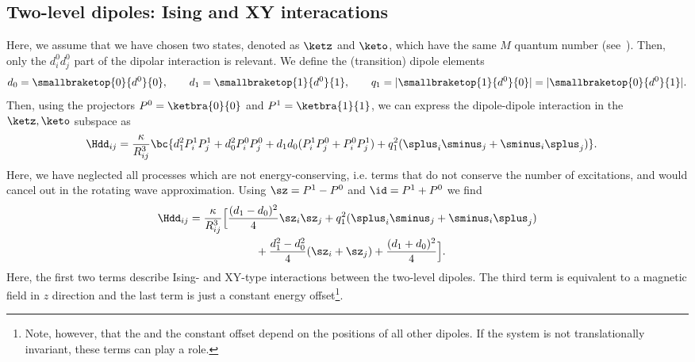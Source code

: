 \subsection{Two-level dipoles: Ising and XY interacations}
Here, we assume that we have chosen two states, denoted as $\ketz$ and $\keto$, which have the
same $M$ quantum number (see~).
Then, only the $d^0_id^0_j$ part of the dipolar interaction is relevant.
We define the (transition) dipole elements
\begin{align}
    d_0 = \smallbraketop{0}{d^0}{0},\qquad
    d_1 = \smallbraketop{1}{d^0}{1},\qquad
    q_1 = |\smallbraketop{1}{d^0}{0}| = |\smallbraketop{0}{d^0}{1}|.
\end{align}
Then, using the projectors $P^0 = \ketbra{0}{0}$ and $P^1 = \ketbra{1}{1}$, we can express the
dipole-dipole interaction  in the $\ketz, \keto$ subspace as
\begin{align}
    \Hdd_{ij} &= \frac{\kappa}{R_{ij}^3} \bc {d_1^2 P^1_i P^1_j + d_0^2 P^0_i P^0_j + d_1d_0 (P^1_i P^0_j + P^0_i P^1_j) + q_1^2 (\splus_i \sminus_j + \sminus_i \splus_j) }.
\end{align}
Here, we have neglected all processes which are not energy-conserving,
i.e. terms that do not conserve the number of excitations, and would
cancel out in the rotating wave approximation.
Using $\sz = P^1 - P^0$ and $\id = P^1 + P^0$ we find
\begin{align}
    \Hdd_{ij} &= \frac{\kappa}{R_{ij}^3} \Big[ \frac{(d_1-d_0)^2}{4} \sz_i \sz_j  + q_1^2 (\splus_i \sminus_j + \sminus_i \splus_j)\\
              &\qquad\qquad\qquad + \frac{d_1^2 - d_0^2}{4} (\sz_i + \sz_j)  + \frac{(d_1+d_0)^2}{4} \Big].
\end{align}
Here, the first two terms describe Ising- and XY-type interactions between the two-level dipoles. The third term is equivalent to a magnetic field in $z$ direction and the last term is just a constant energy offset\footnote{Note, however, that the  and the constant offset depend on the positions of all other dipoles. If the system is not translationally invariant, these terms can play a role.}.

